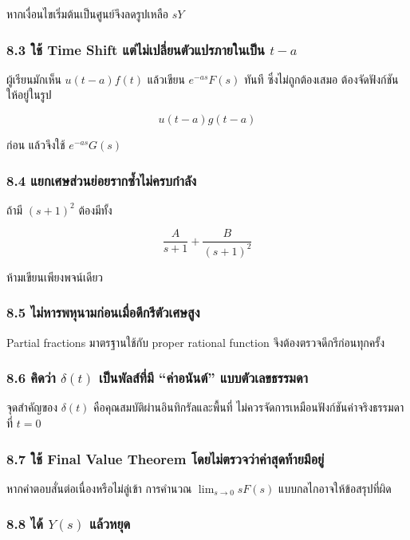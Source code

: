 หากเงื่อนไขเริ่มต้นเป็นศูนย์จึงลดรูปเหลือ $sY$

\subsubsection{\texorpdfstring{8.3 ใช้ Time Shift แต่ไม่เปลี่ยนตัวแปรภายในเป็น $t-a$}{8.3 ใช้ Time Shift แต่ไม่เปลี่ยนตัวแปรภายในเป็น t-a}}

ผู้เรียนมักเห็น $u(t-a)f(t)$ แล้วเขียน $e^{-as}F(s)$ ทันที ซึ่งไม่ถูกต้องเสมอ ต้องจัดฟังก์ชันให้อยู่ในรูป

\[
u(t-a)g(t-a)
\]

ก่อน แล้วจึงใช้ $e^{-as}G(s)$

\subsubsection{8.4 แยกเศษส่วนย่อยรากซ้ำไม่ครบกำลัง}

ถ้ามี $(s+1)^2$ ต้องมีทั้ง

\[
\frac{A}{s+1}+\frac{B}{(s+1)^2}
\]

ห้ามเขียนเพียงพจน์เดียว

\subsubsection{8.5 ไม่หารพหุนามก่อนเมื่อดีกรีตัวเศษสูง}

Partial fractions มาตรฐานใช้กับ proper rational function จึงต้องตรวจดีกรีก่อนทุกครั้ง

\subsubsection{\texorpdfstring{8.6 คิดว่า $\delta(t)$ เป็นพัลส์ที่มี “ค่าอนันต์” แบบตัวเลขธรรมดา}{8.6 คิดว่า delta(t) เป็นพัลส์ที่มี ค่าอนันต์ แบบตัวเลขธรรมดา}}

จุดสำคัญของ $\delta(t)$ คือคุณสมบัติผ่านอินทิกรัลและพื้นที่ ไม่ควรจัดการเหมือนฟังก์ชันค่าจริงธรรมดาที่ $t=0$

\subsubsection{8.7 ใช้ Final Value Theorem โดยไม่ตรวจว่าค่าสุดท้ายมีอยู่}

หากคำตอบสั่นต่อเนื่องหรือไม่ลู่เข้า การคำนวณ $\lim_{s\to0}sF(s)$ แบบกลไกอาจให้ข้อสรุปที่ผิด

\subsubsection{\texorpdfstring{8.8 ได้ $Y(s)$ แล้วหยุด}{8.8 ได้ Y(s) แล้วหยุด}}


